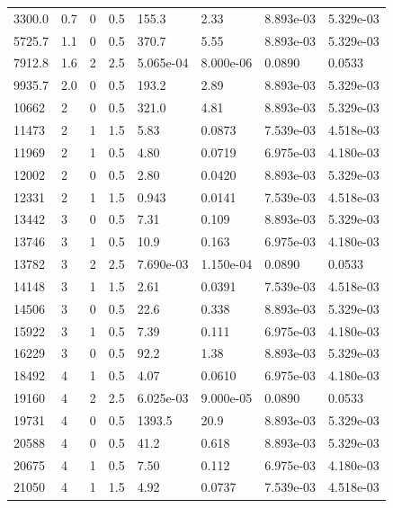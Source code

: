 \documentclass[preview]{standalone}
\begin{document}
{{\begin{tabular}{L{1.2cm}C{1.2cm} C{0.3cm}C{0.5cm} C{1.4cm}C{1.4cm} C{1.4cm}C{1.4cm}}
  3300.0  &   0.7  & 0     & 0.5 &  155.3  & 2.33  & 8.893e-03 &  5.329e-03   \\ 
  5725.7  &   1.1  & 0     & 0.5 &  370.7  & 5.55  & 8.893e-03 &  5.329e-03   \\ 
  7912.8  &   1.6  & 2     & 2.5 &  5.065e-04  & 8.000e-06  & 0.0890 &  0.0533   \\ 
  9935.7  &   2.0  & 0     & 0.5 &  193.2  & 2.89  & 8.893e-03 &  5.329e-03   \\ 
  10662  &     2  & 0     & 0.5 &  321.0  & 4.81  & 8.893e-03 &  5.329e-03   \\ 
  11473  &     2  & 1     & 1.5 &  5.83  & 0.0873  & 7.539e-03 &  4.518e-03   \\ 
  11969  &     2  & 1     & 0.5 &  4.80  & 0.0719  & 6.975e-03 &  4.180e-03   \\ 
  12002  &     2  & 0     & 0.5 &  2.80  & 0.0420  & 8.893e-03 &  5.329e-03   \\ 
  12331  &     2  & 1     & 1.5 &  0.943  & 0.0141  & 7.539e-03 &  4.518e-03   \\ 
  13442  &     3  & 0     & 0.5 &  7.31  & 0.109  & 8.893e-03 &  5.329e-03   \\ 
  13746  &     3  & 1     & 0.5 &  10.9  & 0.163  & 6.975e-03 &  4.180e-03   \\ 
  13782  &     3  & 2     & 2.5 &  7.690e-03  & 1.150e-04  & 0.0890 &  0.0533   \\ 
  14148  &     3  & 1     & 1.5 &  2.61  & 0.0391  & 7.539e-03 &  4.518e-03   \\ 
  14506  &     3  & 0     & 0.5 &  22.6  & 0.338  & 8.893e-03 &  5.329e-03   \\ 
  15922  &     3  & 1     & 0.5 &  7.39  & 0.111  & 6.975e-03 &  4.180e-03   \\ 
  16229  &     3  & 0     & 0.5 &  92.2  & 1.38  & 8.893e-03 &  5.329e-03   \\ 
  18492  &     4  & 1     & 0.5 &  4.07  & 0.0610  & 6.975e-03 &  4.180e-03   \\ 
  19160  &     4  & 2     & 2.5 &  6.025e-03  & 9.000e-05  & 0.0890 &  0.0533   \\ 
  19731  &     4  & 0     & 0.5 &  1393.5  & 20.9  & 8.893e-03 &  5.329e-03   \\ 
  20588  &     4  & 0     & 0.5 &  41.2  & 0.618  & 8.893e-03 &  5.329e-03   \\ 
  20675  &     4  & 1     & 0.5 &  7.50  & 0.112  & 6.975e-03 &  4.180e-03   \\ 
  21050  &     4  & 1     & 1.5 &  4.92  & 0.0737  & 7.539e-03 &  4.518e-03   \\ 

\end{tabular}}}
\end{document}
